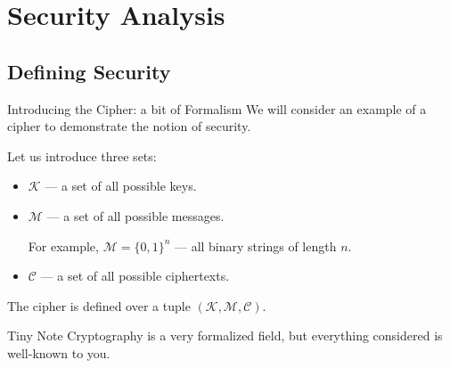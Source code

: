 \documentclass{zkdl-presentation-template}
\begin{document}
    \section{Security Analysis}

    \subsection{Defining Security}

    \begin{frame}{Introducing the Cipher: a bit of Formalism}
        We will consider an example of a cipher to demonstrate the notion of security.

        Let us introduce three sets:
        \begin{itemize}
            \item $\mathcal{K}$ --- a set of all possible keys.
            \item $\mathcal{M}$ --- a set of all possible messages. 
            
            For example, $\mathcal{M} = \{0,1\}^n$ --- all binary strings of length $n$.
            \item $\mathcal{C}$ --- a set of all possible ciphertexts.
        \end{itemize}

        The cipher is defined over a tuple $(\mathcal{K}, \mathcal{M}, \mathcal{C})$.
        \pause

        \begin{remarkblock}{Tiny Note}
            Cryptography is a very formalized field, but everything considered is well-known to you.
        \end{remarkblock}
    \end{frame}
\end{document}
